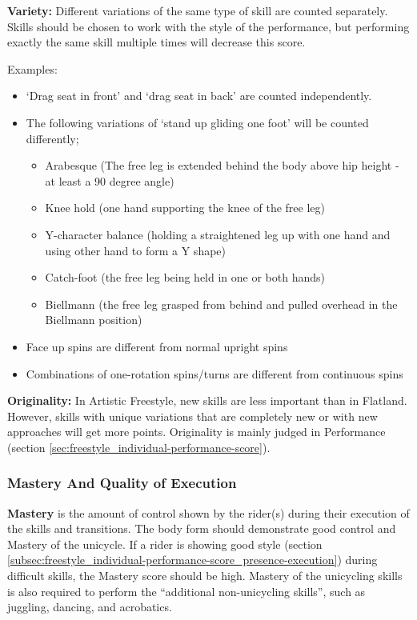 \textbf{Variety:} Different variations of the same type of skill are counted separately.
Skills should be chosen to work with the style of the performance, but performing exactly the same skill multiple times will decrease this score.

Examples:
\begin{itemize}
\item `Drag seat in front' and `drag seat in back' are counted independently.
\item The following variations of `stand up gliding one foot' will be counted differently;
	\begin{itemize}
 	\item Arabesque (The free leg is extended behind the body above hip height - at least a 90 degree angle)
	\item Knee hold (one hand supporting the knee of the free leg)
	\item Y-character balance (holding a straightened leg up with one hand and using other hand to form a Y shape)
	\item Catch-foot (the free leg being held in one or both hands)
	\item Biellmann (the free leg grasped from behind and pulled overhead in the Biellmann position) 
	\end{itemize}
\item Face up spins are different from normal upright spins 
\item Combinations of one-rotation spins/turns are different from continuous spins
\end{itemize}

\textbf{Originality:} In Artistic Freestyle, new skills are less important than in Flatland.%
However, skills with unique variations that are completely new or with new approaches will get more points.
Originality is mainly judged in Performance (section \ref{sec:freestyle_individual-performance-score}).

\subsubsection{Mastery And Quality of Execution}
\textbf{Mastery} is the amount of control shown by the rider(s) during their execution of the skills and transitions.
The body form should demonstrate good control and Mastery of the unicycle.
If a rider is showing good style (section \ref{subsec:freestyle_individual-performance-score_presence-execution}) during difficult skills, the Mastery score should be high.
Mastery of the unicycling skills is also required to perform the ``additional non-unicycling skills'', such as juggling, dancing, and acrobatics.

